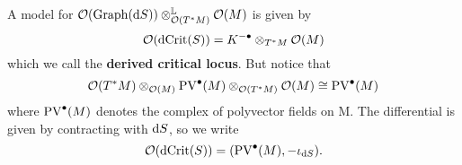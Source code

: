 \begin{example}
\begin{itemize}
\begin{equation*}
    \end{equation*}
    A model for $\mathcal{O}(\operatorname{Graph}(\mathrm{d} S)) \otimes_{\mathcal{O}(T^* M)}^{\mathbb{L}} \mathcal{O}(M)$ is given by
    \begin{equation*}
      \mathcal{O}(\operatorname{dCrit}(S)) = K^{-\bullet} \otimes_{T^* M} \mathcal{O}(M)
    \end{equation*}
    which we call the \textbf{derived critical locus}. But notice that
    \begin{equation*}
      \mathcal{O}(T^* M) \otimes_{\mathcal{O}(M)} \operatorname{PV}^\bullet(M) \otimes_{\mathcal{O}(T^* M)} \mathcal{O}(M) \cong \operatorname{PV}^\bullet(M)
    \end{equation*}
    where $\operatorname{PV}^\bullet(M)$ denotes the complex of polyvector fields on M. The differential is given by contracting with $\mathrm{d} S$, so we write
    \begin{equation*}
      \mathcal{O}(\operatorname{dCrit}(S)) = (\operatorname{PV}^\bullet(M), -\iota_{\mathrm{d} S}).
    \end{equation*}
  \end{itemize}
\end{example}

